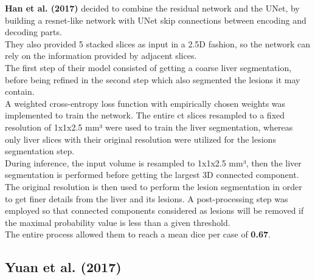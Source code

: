 \textbf{Han et al. (2017)} decided to combine the residual network and
the UNet, by building a resnet-like network with UNet skip connections
between encoding and decoding parts.\\
They also provided 5 stacked slices as input in a 2.5D fashion, so the
network can rely on the information provided by adjacent slices.\\
The first step of their model consisted of getting a coarse liver
segmentation, before being refined in the second step which also
segmented the lesions it may contain.\\
A weighted cross-entropy loss function with empirically chosen weights
was implemented to train the network. The entire \ac{ct} slices resampled to
a fixed resolution of 1x1x2.5 mm³ were used to train the liver
segmentation, whereas only liver slices with their original resolution
were utilized for the lesions segmentation step.\\
During inference, the input volume is resampled to 1x1x2.5 mm³, then the
liver segmentation is performed before getting the largest 3D connected
component. The original resolution is then used to perform the lesion
segmentation in order to get finer details from the liver and its
lesions. A post-processing step was employed so that connected
components considered as lesions will be removed if the maximal
probability value is less than a given threshold.\\
The entire process allowed them to reach a mean dice per case of
\textbf{0.67}.

\subsection*{Yuan et al. (2017)}\label{yuan-et-al.-2017}

